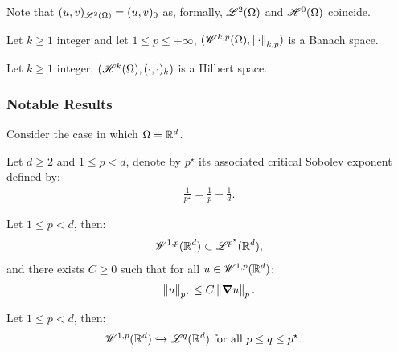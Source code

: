 Note that $(u, v)_{\mathscr{L}^{2}(\Omega)} = (u, v)_0$ as, formally, $\mathscr{L}^{2}(\Omega)$ and $\mathscr{H}^{0}(\Omega)$ coincide. %

\begin{remark}
    Let $k \geq 1$ integer and let $1 \leq p \leq +\infty$, $(\mathscr{W}^{k, p}(\Omega), \left\lVert \cdot \right\rVert_{k, p})$ is a Banach space.
\end{remark}

\begin{remark}
    Let $k \geq 1$ integer, $(\mathscr{H}^{k}(\Omega), (\cdot, \cdot)_k)$ is a Hilbert space.
\end{remark}

\newpage
\subsubsection{Notable Results}

Consider the case in which $\Omega = \mathbb{R}^{d}$.

\begin{definition}
    Let $d \geq 2$ and $1 \leq p < d$, denote by $p^{\star}$ its associated critical Sobolev exponent defined by:
    \begin{align}
        \frac{1}{p^{\star}} = \frac{1}{p} - \frac{1}{d}.
    \end{align}
\end{definition}

\begin{theorem}
    Let $1 \leq p < d$, then:
    \begin{align}
        \mathscr{W}^{1, p}(\mathbb{R}^{d}) \subset \mathscr{L}^{p^{\star}}(\mathbb{R}^{d}),
    \end{align}
    and there exists $C \geq 0$ such that for all $u \in \mathscr{W}^{1, p}(\mathbb{R}^{d})$:
    \begin{align}
        \left\lVert u \right\rVert_{p^{\star}} \leq C \left\lVert \bm{\nabla} u \right\rVert_p.
    \end{align}
\end{theorem}

\begin{corollary}
    Let $1 \leq p < d$, then:
    \begin{align}
        \mathscr{W}^{1, p}(\mathbb{R}^{d}) \hookrightarrow \mathscr{L}^{q}(\mathbb{R}^{d}) &\text{ for all } p \leq q \leq p^{\star}.
    \end{align}
\end{corollary}

